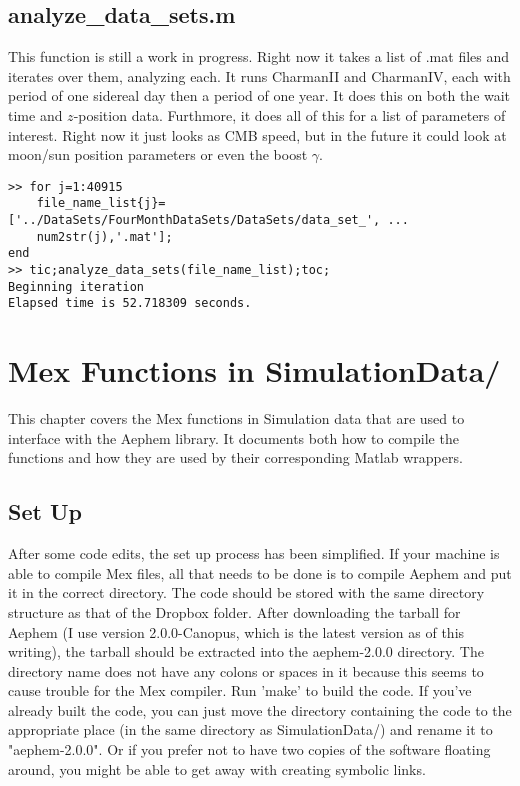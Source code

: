 \documentclass[12pt]{report}
\begin{document}
\section{analyze\_data\_sets.m}
This function is still a work in progress.  Right now it takes a list of .mat files and iterates over them, analyzing each.  It runs CharmanII and CharmanIV, each with period of one sidereal day then a period of one year.  It does this on both the wait time and $z$-position data.  Furthmore, it does all of this for a list of parameters of interest.  Right now it just looks as CMB speed, but in the future it could look at moon/sun position parameters or even the boost $\gamma$.
\begin{verbatim}
>> for j=1:40915
    file_name_list{j}=['../DataSets/FourMonthDataSets/DataSets/data_set_', ...
    num2str(j),'.mat'];
end
>> tic;analyze_data_sets(file_name_list);toc;
Beginning iteration
Elapsed time is 52.718309 seconds.
\end{verbatim}





\chapter{Mex Functions in SimulationData/}
\label{chap:mex_functions}
This chapter covers the Mex functions in Simulation data that are used to interface with the Aephem library.  It documents both how to compile the functions and how they are used by their corresponding Matlab wrappers.

\section{Set Up}
After some code edits, the set up process has been simplified.  If your machine is able to compile Mex files, all that needs to be done is to compile Aephem and put it in the correct directory.  The code should be stored with the same directory structure as that of the Dropbox folder.  After downloading the tarball for Aephem (I use version 2.0.0-Canopus, which is the latest version as of this writing), the tarball should be extracted into the aephem-2.0.0 directory.  The directory name does not have any colons or spaces in it because this seems to cause trouble for the Mex compiler.  Run 'make' to build the code.  If you've already built the code, you can just move the directory containing the code to the appropriate place (in the same directory as SimulationData/) and rename it to "aephem-2.0.0".  Or if you prefer not to have two copies of the software floating around, you might be able to get away with creating symbolic links.
\end{document}
